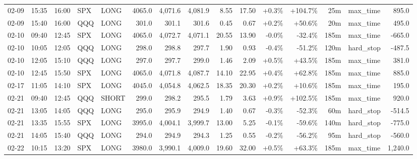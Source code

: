 \documentclass[11pt,a4paper,twoside]{article}
\begin{document}
\begin{landscape}
\begin{center}
\begin{longtable}{>{\color{txtmain}}l l l l l r r r r r r r r >{\color{txtmain}}l r}
02-09 & 15:35 & 16:00 & SPX & LONG & 4065.0 & 4,071.6 & 4,081.9 & 8.55 & 17.50 & \textcolor{wingreen}{+0.3\%} & \textcolor{wingreen}{+104.7\%} & 25m & max\_time & \textcolor{wingreen}{895.0} \\
02-09 & 15:40 & 16:00 & QQQ & LONG & 301.0 & 301.1 & 301.6 & 0.45 & 0.67 & \textcolor{wingreen}{+0.2\%} & \textcolor{wingreen}{+50.6\%} & 20m & max\_time & \textcolor{wingreen}{495.0} \\
02-10 & 09:40 & 12:45 & SPX & LONG & 4065.0 & 4,072.7 & 4,071.1 & 20.55 & 13.90 & \textcolor{lossred}{-0.0\%} & \textcolor{lossred}{-32.4\%} & 185m & max\_time & \textcolor{lossred}{-665.0} \\
02-10 & 10:05 & 12:05 & QQQ & LONG & 298.0 & 298.8 & 297.7 & 1.90 & 0.93 & \textcolor{lossred}{-0.4\%} & \textcolor{lossred}{-51.2\%} & 120m & hard\_stop & \textcolor{lossred}{-487.5} \\
02-10 & 12:05 & 15:10 & QQQ & LONG & 297.0 & 297.7 & 299.0 & 1.46 & 2.09 & \textcolor{wingreen}{+0.5\%} & \textcolor{wingreen}{+43.5\%} & 185m & max\_time & \textcolor{wingreen}{381.0} \\
02-10 & 12:45 & 15:50 & SPX & LONG & 4065.0 & 4,071.8 & 4,087.7 & 14.10 & 22.95 & \textcolor{wingreen}{+0.4\%} & \textcolor{wingreen}{+62.8\%} & 185m & max\_time & \textcolor{wingreen}{885.0} \\
02-17 & 11:05 & 14:10 & SPX & LONG & 4045.0 & 4,054.8 & 4,062.5 & 18.35 & 20.30 & \textcolor{wingreen}{+0.2\%} & \textcolor{wingreen}{+10.6\%} & 185m & max\_time & \textcolor{wingreen}{195.0} \\
02-21 & 09:40 & 12:45 & QQQ & SHORT & 299.0 & 298.2 & 295.5 & 1.79 & 3.63 & \textcolor{wingreen}{+0.9\%} & \textcolor{wingreen}{+102.5\%} & 185m & max\_time & \textcolor{wingreen}{920.0} \\
02-21 & 13:05 & 14:05 & QQQ & LONG & 295.0 & 295.9 & 294.9 & 1.40 & 0.67 & \textcolor{lossred}{-0.3\%} & \textcolor{lossred}{-52.3\%} & 60m & hard\_stop & \textcolor{lossred}{-514.5} \\
02-21 & 13:35 & 15:55 & SPX & LONG & 3995.0 & 4,004.1 & 3,999.7 & 13.00 & 5.25 & \textcolor{lossred}{-0.1\%} & \textcolor{lossred}{-59.6\%} & 140m & hard\_stop & \textcolor{lossred}{-775.0} \\
02-21 & 14:05 & 15:40 & QQQ & LONG & 294.0 & 294.9 & 294.3 & 1.25 & 0.55 & \textcolor{lossred}{-0.2\%} & \textcolor{lossred}{-56.2\%} & 95m & hard\_stop & \textcolor{lossred}{-560.0} \\
02-22 & 10:15 & 13:20 & SPX & LONG & 3980.0 & 3,990.1 & 4,009.0 & 19.60 & 32.00 & \textcolor{wingreen}{+0.5\%} & \textcolor{wingreen}{+63.3\%} & 185m & max\_time & \textcolor{wingreen}{1,240.0} \\

\end{longtable}
\end{center}
\end{landscape}
\end{document}

